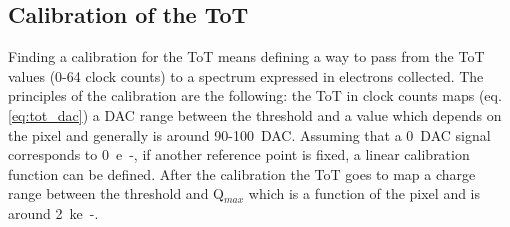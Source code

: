     \subsection{Calibration of the ToT}\label{sec:cal_ToT}
        Finding a calibration for the ToT means defining a way to pass from the ToT values (0-64 clock counts) to a spectrum expressed in electrons collected. 
        The principles of the calibration are the following: the ToT in clock counts maps (eq.\ref{eq:tot_dac}) a DAC range between the threshold and a value which depends on the pixel and generally is around 90-100~\si{DAC}. Assuming that a \SI{0}{DAC} signal corresponds to \SI{0}{e-}, if another reference point is fixed, a linear calibration function can be defined. 
        After the calibration the ToT goes to map a charge range between the threshold and Q$_{max}$ which is a function of the pixel and is around \SI{2}{ke-}.    
